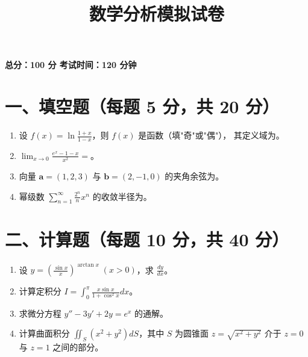 \documentclass[12pt,a4paper]{ctexart}
\title{数学分析模拟试卷}
\author{}
\date{}
\begin{document}
\maketitle

\begin{center}
\textbf{总分：100 分 \quad 考试时间：120 分钟}
\end{center}

\bigskip

\section*{一、填空题（每题 5 分，共 20 分）}

\begin{enumerate}[leftmargin=*,label=\arabic*.]
  \item 设 $f(x) = \ln\frac{1+x}{1-x}$，则 $f(x)$ 是\underline{\hspace{2cm}}函数（填"奇"或"偶"），
    其定义域为\underline{\hspace{2cm}}。

  \item $\displaystyle\lim_{x\to 0}\frac{e^x - 1 - x}{x^2} = $\underline{\hspace{2cm}}。

  \item 向量 $\mathbf{a} = (1,2,3)$ 与 $\mathbf{b} = (2,-1,0)$ 的夹角余弦为\underline{\hspace{2cm}}。

  \item 幂级数 $\displaystyle\sum_{n=1}^{\infty}\frac{2^n}{n}x^n$ 的收敛半径为\underline{\hspace{2cm}}。
\end{enumerate}

\section*{二、计算题（每题 10 分，共 40 分）}

\begin{enumerate}[leftmargin=*,label=\arabic*.,start=5]
  \item 设 $y = \left(\frac{\sin x}{x}\right)^{\arctan x}\;(x>0)$，求 $\frac{dy}{dx}$。

  \item 计算定积分 $I = \displaystyle\int_0^{\pi} \frac{x\sin x}{1+\cos^2 x} dx$。

  \item 求微分方程 $y'' - 3y' + 2y = e^x$ 的通解。

  \item 计算曲面积分 $\displaystyle\iint_S (x^2+y^2) dS$，其中 $S$ 为圆锥面
    $z = \sqrt{x^2+y^2}$ 介于 $z=0$ 与 $z=1$ 之间的部分。
\end{enumerate}
\end{document}
